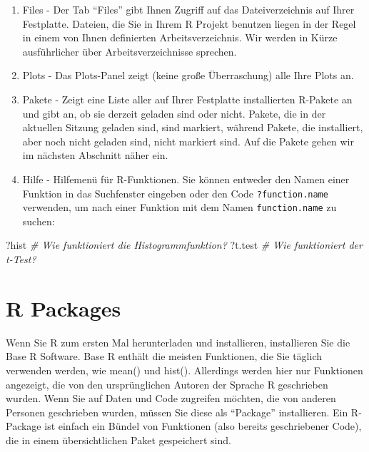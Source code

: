 \documentclass[
]{book}
\newenvironment{Shaded}{\begin{snugshade}}{\end{snugshade}}
\newcommand{\CommentTok}[1]{\textcolor[rgb]{0.56,0.35,0.01}{\textit{#1}}}
\newcommand{\NormalTok}[1]{#1}
\begin{document}
\begin{enumerate}
\def\labelenumi{\arabic{enumi}.}
\item
  Files - Der Tab ``Files'' gibt Ihnen Zugriff auf das Dateiverzeichnis auf Ihrer Festplatte. Dateien, die Sie in Ihrem R Projekt benutzen liegen in der Regel in einem von Ihnen definierten Arbeitsverzeichnis. Wir werden in Kürze ausführlicher über Arbeitsverzeichnisse sprechen.
\item
  Plots - Das Plots-Panel zeigt (keine große Überraschung) alle Ihre Plots an.
\item
  Pakete - Zeigt eine Liste aller auf Ihrer Festplatte installierten R-Pakete an und gibt an, ob sie derzeit geladen sind oder nicht. Pakete, die in der aktuellen Sitzung geladen sind, sind markiert, während Pakete, die installiert, aber noch nicht geladen sind, nicht markiert sind. Auf die Pakete gehen wir im nächsten Abschnitt näher ein.
\item
  Hilfe - Hilfemenü für R-Funktionen. Sie können entweder den Namen einer Funktion in das Suchfenster eingeben oder den Code \texttt{?function.name} verwenden, um nach einer Funktion mit dem Namen \texttt{function.name} zu suchen:
\end{enumerate}

\begin{Shaded}
\begin{Highlighting}[]
\NormalTok{?hist   }\CommentTok{\# Wie funktioniert die Histogrammfunktion?}
\NormalTok{?t.test }\CommentTok{\# Wie funktioniert der t{-}Test?}
\end{Highlighting}
\end{Shaded}

\hypertarget{r-packages}{%
\section{R Packages}\label{r-packages}}

Wenn Sie R zum ersten Mal herunterladen und installieren, installieren Sie die Base R Software.
Base R enthält die meisten Funktionen, die Sie täglich verwenden werden, wie mean() und hist().
Allerdings werden hier nur Funktionen angezeigt, die von den ursprünglichen Autoren der Sprache R geschrieben wurden.
Wenn Sie auf Daten und Code zugreifen möchten, die von anderen Personen geschrieben wurden, müssen Sie diese als ``Package'' installieren.
Ein R-Package ist einfach ein Bündel von Funktionen (also bereits geschriebener Code), die in einem übersichtlichen Paket gespeichert sind.
\end{document}
